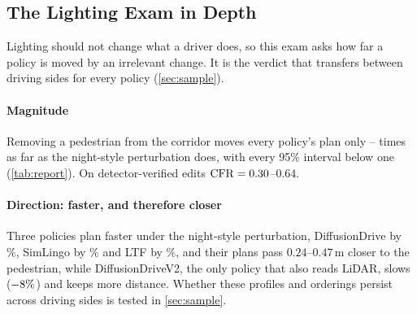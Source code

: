 \subsection{The Lighting Exam in Depth}
\label{sec:lighting}


Lighting should not change what a driver does, so this exam asks how far a policy is moved by an
irrelevant change. It is the verdict that transfers between driving sides for every policy (\cref{sec:sample}).

\paragraph{Magnitude}
Removing a pedestrian from the corridor moves every policy's plan only \NumCFRlo--\NumCFRhi{} times as
far as the night-style perturbation does, with every 95\% interval below one (\cref{tab:report}). On detector-verified edits $\mathrm{CFR}=0.30$--$0.64$.

\paragraph{Direction: faster, and therefore closer}
Three policies plan faster under the night-style perturbation, DiffusionDrive by \NumNightDD\%,
SimLingo by \NumNightSL\% and LTF by \NumNightLTF\%, and their plans pass $0.24$--$0.47$\,m closer to
the pedestrian, while DiffusionDriveV2, the only policy that also reads LiDAR, slows
($-8\%$) and keeps more distance. Whether these profiles and orderings persist across driving sides is tested in \cref{sec:sample}.
